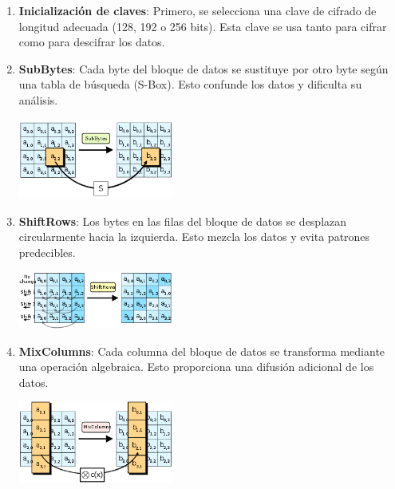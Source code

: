 \documentclass[a4paper, 12pt]{article}
\begin{document}
\begin{enumerate}
\def\labelenumi{\arabic{enumi}.}

\item \textbf{Inicialización de claves}: Primero, se selecciona una clave de cifrado de longitud adecuada (128, 192 o 256 bits). Esta clave se usa tanto para cifrar como para descifrar los datos.

\item \textbf{SubBytes}: Cada byte del bloque de datos se sustituye por otro byte según una tabla de búsqueda (S-Box). Esto confunde los datos y dificulta su análisis.

\begin{center}
  \includegraphics[width=0.4\textwidth]{images/SubBytes.png}
\end{center}

\item \textbf{ShiftRows}: Los bytes en las filas del bloque de datos se desplazan circularmente hacia la izquierda. Esto mezcla los datos y evita patrones predecibles.

\begin{center}
  \includegraphics[width=0.4\textwidth]{images/ShiftRows.png}
\end{center}

\item \textbf{MixColumns}: Cada columna del bloque de datos se transforma mediante una operación algebraica. Esto proporciona una difusión adicional de los datos.

\begin{center}
  \includegraphics[width=0.4\textwidth]{images/MixColumn.png}
\end{center}


\end{enumerate}
\end{document}
